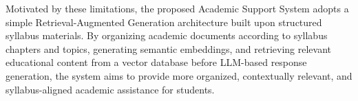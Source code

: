 Motivated by these limitations, the proposed Academic Support System adopts a simple Retrieval-Augmented Generation architecture built upon structured syllabus materials. By organizing academic documents according to syllabus chapters and topics, generating semantic embeddings, and retrieving relevant educational content from a vector database before LLM-based response generation, the system aims to provide more organized, contextually relevant, and syllabus-aligned academic assistance for students. \par
